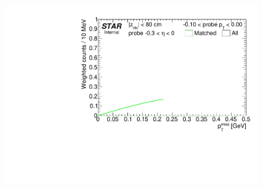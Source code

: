 \begin{figure}[h!]
{}~
\parbox{0.24\textwidth}{
  \centering
  \includegraphics[width=\linewidth,page=6]{graphics/correctionsToEff/TOF_tagAndProbe/Fitting_effVsPt_mc_ETABINS_C.CPT2.pdf}%

}%
\end{figure}
